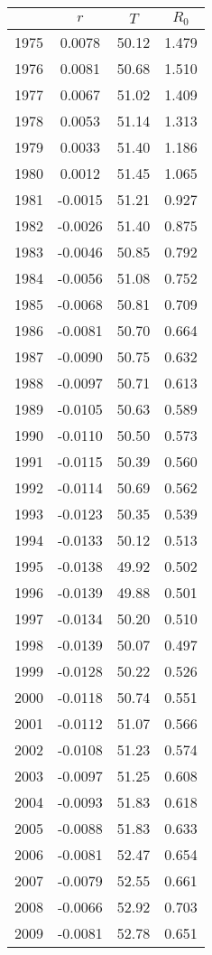 \begin{tabular}{cccc}
  \hline
 & $r$ & $T$ & $R_0$ \\ 
  \hline
1975 & 0.0078 & 50.12 & 1.479 \\ 
  1976 & 0.0081 & 50.68 & 1.510 \\ 
  1977 & 0.0067 & 51.02 & 1.409 \\ 
  1978 & 0.0053 & 51.14 & 1.313 \\ 
  1979 & 0.0033 & 51.40 & 1.186 \\ 
  1980 & 0.0012 & 51.45 & 1.065 \\ 
  1981 & -0.0015 & 51.21 & 0.927 \\ 
  1982 & -0.0026 & 51.40 & 0.875 \\ 
  1983 & -0.0046 & 50.85 & 0.792 \\ 
  1984 & -0.0056 & 51.08 & 0.752 \\ 
  1985 & -0.0068 & 50.81 & 0.709 \\ 
  1986 & -0.0081 & 50.70 & 0.664 \\ 
  1987 & -0.0090 & 50.75 & 0.632 \\ 
  1988 & -0.0097 & 50.71 & 0.613 \\ 
  1989 & -0.0105 & 50.63 & 0.589 \\ 
  1990 & -0.0110 & 50.50 & 0.573 \\ 
  1991 & -0.0115 & 50.39 & 0.560 \\ 
  1992 & -0.0114 & 50.69 & 0.562 \\ 
  1993 & -0.0123 & 50.35 & 0.539 \\ 
  1994 & -0.0133 & 50.12 & 0.513 \\ 
  1995 & -0.0138 & 49.92 & 0.502 \\ 
  1996 & -0.0139 & 49.88 & 0.501 \\ 
  1997 & -0.0134 & 50.20 & 0.510 \\ 
  1998 & -0.0139 & 50.07 & 0.497 \\ 
  1999 & -0.0128 & 50.22 & 0.526 \\ 
  2000 & -0.0118 & 50.74 & 0.551 \\ 
  2001 & -0.0112 & 51.07 & 0.566 \\ 
  2002 & -0.0108 & 51.23 & 0.574 \\ 
  2003 & -0.0097 & 51.25 & 0.608 \\ 
  2004 & -0.0093 & 51.83 & 0.618 \\ 
  2005 & -0.0088 & 51.83 & 0.633 \\ 
  2006 & -0.0081 & 52.47 & 0.654 \\ 
  2007 & -0.0079 & 52.55 & 0.661 \\ 
  2008 & -0.0066 & 52.92 & 0.703 \\ 
  2009 & -0.0081 & 52.78 & 0.651 \\ 
   \hline
\end{tabular}
